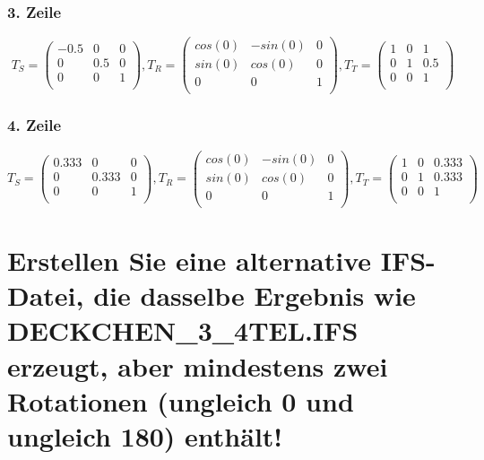 \documentclass[]{article}
\begin{document}
 \subsubsection*{3. Zeile}
\[
T_S = \begin{pmatrix}
-0.5 & 0 & 0 \\
0 & 0.5 & 0 \\
0 & 0 & 1 \\
\end{pmatrix},
T_R = \begin{pmatrix}
cos(0) & -sin(0) & 0 \\
sin(0) & cos(0) & 0 \\
0 & 0 & 1 \\
\end{pmatrix},
T_T = \begin{pmatrix}
1 & 0 & 1 \\
0 & 1 & 0.5 \\
0 & 0 & 1 \\
\end{pmatrix}
\]
 
 \subsubsection*{4. Zeile}
\[
T_S = \begin{pmatrix}
0.333 & 0 & 0 \\
0 & 0.333 & 0 \\
0 & 0 & 1 \\
\end{pmatrix},
T_R = \begin{pmatrix}
cos(0) & -sin(0) & 0 \\
sin(0) & cos(0) & 0 \\
0 & 0 & 1 \\
\end{pmatrix},
T_T = \begin{pmatrix}
1 & 0 & 0.333 \\
0 & 1 & 0.333 \\
0 & 0 & 1 \\
\end{pmatrix}
\]
\section{ Erstellen Sie eine alternative IFS-Datei, die dasselbe Ergebnis wie DECKCHEN\_3\_4TEL.IFS erzeugt, aber mindestens zwei Rotationen (ungleich 0 und ungleich 180) enthält!}
\end{document}
